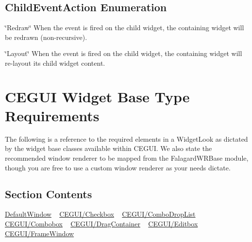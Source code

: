 \hypertarget{fal_enum_ref_fal_enum_ref_sec_12}{}\subsection{Child\+Event\+Action Enumeration}\label{fal_enum_ref_fal_enum_ref_sec_12}
\begin{DoxyItemize}
\item {\ttfamily \char`\"{}\+Redraw\char`\"{}} When the event is fired on the child widget, the containing widget will be redrawn (non-\/recursive). \item {\ttfamily \char`\"{}\+Layout\char`\"{}} When the event is fired on the child widget, the containing widget will re-\/layout its child widget content. \end{DoxyItemize}
\hypertarget{fal_baseclass_ref}{}\section{C\+E\+G\+UI Widget Base Type Requirements}\label{fal_baseclass_ref}
The following is a reference to the required elements in a Widget\+Look as dictated by the widget base classes available within C\+E\+G\+UI. We also state the recommended window renderer to be mapped from the Falagard\+W\+R\+Base module, though you are free to use a custom window renderer as your needs dictate.\hypertarget{fal_baseclass_ref_fal_baseclass_ref_sec_0}{}\subsection{Section Contents}\label{fal_baseclass_ref_fal_baseclass_ref_sec_0}
\mbox{\hyperlink{fal_baseclass_ref_fal_baseclass_ref_sec_1}{Default\+Window}} ~\newline
 \mbox{\hyperlink{fal_baseclass_ref_fal_baseclass_ref_sec_2}{C\+E\+G\+U\+I/\+Checkbox}} ~\newline
 \mbox{\hyperlink{fal_baseclass_ref_fal_baseclass_ref_sec_3}{C\+E\+G\+U\+I/\+Combo\+Drop\+List}} ~\newline
 \mbox{\hyperlink{fal_baseclass_ref_fal_baseclass_ref_sec_4}{C\+E\+G\+U\+I/\+Combobox}} ~\newline
 \mbox{\hyperlink{fal_baseclass_ref_fal_baseclass_ref_sec_5}{C\+E\+G\+U\+I/\+Drag\+Container}} ~\newline
 \mbox{\hyperlink{fal_baseclass_ref_fal_baseclass_ref_sec_6}{C\+E\+G\+U\+I/\+Editbox}} ~\newline
 \mbox{\hyperlink{fal_baseclass_ref_fal_baseclass_ref_sec_7}{C\+E\+G\+U\+I/\+Frame\+Window}} ~\newline
